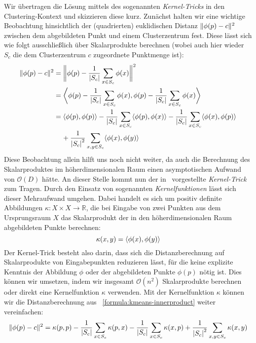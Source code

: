 Wir übertragen die Lösung mittels des sogenannten \emph{Kernel-Tricks} in den Clustering-Kontext und skizzieren diese kurz.
Zunächst halten wir eine wichtige Beobachtung hinsichtlich der (quadrierten) euklidischen Distanz $\lVert {\phi(p)} - {c} \rVert^2$
zwischen dem abgebildeten Punkt und einem Clusterzentrum fest. Diese lässt sich wie folgt ausschließlich über Skalarprodukte
berechnen (wobei auch hier wieder $S_c$ die dem Clusterzentrum $c$ zugeordnete Punktmenge ist):
\begin{align}
\label{formula:kmeans-innerproduct}
	\lVert {\phi(p)} - {c} \rVert^2 &= \bigg\lVert \phi(p) - \frac{1}{\left|S_c\right|} \sum_{x \in S_c} \phi(x) \bigg\rVert^2 \notag \\
	&= \bigg\langle \phi(p) - \frac{1}{\left|S_c\right|} \sum_{x \in S_c} \phi(x),
		\phi(p) - \frac{1}{\left|S_c\right|} \sum_{x \in S_c} \phi(x) \bigg\rangle \notag \\
	&= \langle \phi(p), \phi(p) \rangle - \frac{1}{\left|S_c\right|} \sum_{x \in S_c} \langle \phi(p), \phi(x) \rangle
		- \frac{1}{\left|S_c\right|} \sum_{x \in S_c} \langle \phi(x), \phi(p) \rangle \notag \\
		& \hspace{0.4cm} + \frac{1}{\left|S_c\right|^2} \sum_{x,y \in S_c} \langle \phi(x), \phi(y) \rangle
\end{align}
Diese Beobachtung allein hilft uns noch nicht weiter, da auch die Berechnung des Skalarproduktes im höherdimensionalen
Raum einen asymptotischen Aufwand von $\mathcal{O}(D)$ hätte. An dieser Stelle kommt nun der in~\cite{BoserGV92} vorgestellte
\emph{Kernel-Trick} zum Tragen. Durch den Einsatz von sogenannten \emph{Kernelfunktionen} lässt sich dieser Mehraufwand
umgehen. Dabei handelt es sich um positiv definite Abbildungen $\kappa : X \times X \rightarrow \mathbb{R}$, die bei Eingabe von
zwei Punkten aus dem Ursprungsraum $X$ das Skalarprodukt der in den höherdimensionalen Raum abgebildeten Punkte berechnen:
\[ \kappa(x,y) = \langle \phi(x), \phi(y) \rangle \]
Der Kernel-Trick besteht also darin, dass sich die Distanzberechnung auf Skalarprodukte von Eingabepunkten reduzieren lässt, für
die keine explizite Kenntnis der Abbildung $\phi$ oder der abgebildeten Punkte $\phi(p)$ nötig ist. Dies können wir umsetzen,
indem wir insgesamt $\mathcal{O}(n^2)$ Skalarprodukte berechnen oder direkt eine Kernelfunktion $\kappa$ verwenden.
Mit der Kernelfunktion $\kappa$ können wir die Distanzberechnung aus ~\ref{formula:kmeans-innerproduct} weiter vereinfachen:
\begin{align}
\label{formula:kernel-kmeans}
	\lVert {\phi(p)} - {c} \rVert^2 = \kappa(p,p) - \frac{1}{\left|S_c\right|} \sum_{x \in S_c} \kappa(p, x)
		- \frac{1}{\left|S_c\right|} \sum_{x \in S_c} \kappa(x, p)
		+ \frac{1}{\left|S_c\right|^2} \sum_{x,y \in S_c} \kappa(x, y)
\end{align}

